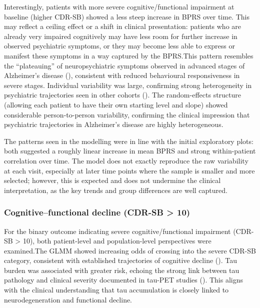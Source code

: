\documentclass[
  9pt,
  letterpaper,
  DIV=11,
  numbers=noendperiod]{scrartcl}
\begin{document}
Interestingly, patients with more severe cognitive/functional impairment
at baseline (higher CDR-SB) showed a less steep increase in BPRS over
time. This may reflect a ceiling effect or a shift in clinical
presentation: patients who are already very impaired cognitively may
have less room for further increase in observed psychiatric symptoms, or
they may become less able to express or manifest these symptoms in a way
captured by the BPRS.This pattern resembles the ``plateauing'' of
neuropsychiatric symptoms observed in advanced stages of Alzheimer's
disease (), consistent with reduced behavioural responsiveness in severe
stages. Individual variability was large, confirming strong
heterogeneity in psychiatric trajectories seen in other cohorts
(). The
random-effects structure (allowing each patient to have their own
starting level and slope) showed considerable person-to-person
variability, confirming the clinical impression that psychiatric
trajectories in Alzheimer's disease are highly heterogeneous.

The patterns seen in the modelling were in line with the initial
exploratory plots: both suggested a roughly linear increase in mean BPRS
and strong within-patient correlation over time. The model does not
exactly reproduce the raw variability at each visit, especially at later
time points where the sample is smaller and more selected; however, this
is expected and does not undermine the clinical interpretation, as the
key trends and group differences are well captured.

\subsubsection{Cognitive--functional decline (CDR-SB \textgreater{}
10)}\label{cognitivefunctional-decline-cdr-sb-10}

For the binary outcome indicating severe cognitive/functional impairment
(CDR-SB \textgreater{} 10), both patient-level and population-level
perspectives were examined.The GLMM showed increasing odds of crossing
into the severe CDR-SB category, consistent with established
trajectories of cognitive decline
().
Tau burden was associated with greater risk, echoing the strong link
between tau pathology and clinical severity documented in tau-PET
studies (). This aligns with the clinical understanding that tau
accumulation is closely linked to neurodegeneration and functional
decline.
\end{document}
